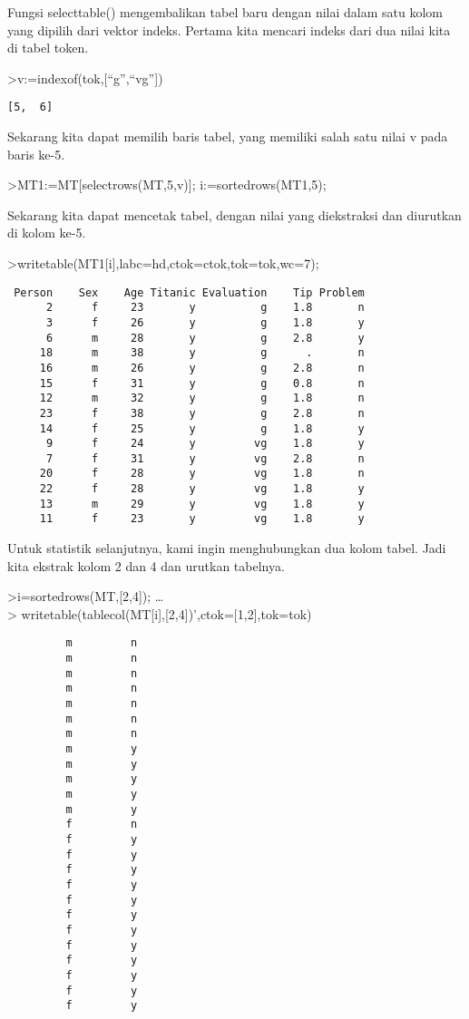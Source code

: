 \documentclass[
]{book}
\begin{document}
Fungsi selecttable() mengembalikan tabel baru dengan nilai dalam satu kolom yang dipilih dari vektor indeks. Pertama kita mencari indeks dari dua nilai kita di tabel token.

\textgreater v:=indexof(tok,{[}``g'',``vg''{]})

\begin{verbatim}
[5,  6]
\end{verbatim}

Sekarang kita dapat memilih baris tabel, yang memiliki salah satu nilai v pada baris ke-5.

\textgreater MT1:=MT{[}selectrows(MT,5,v){]}; i:=sortedrows(MT1,5);

Sekarang kita dapat mencetak tabel, dengan nilai yang diekstraksi dan diurutkan di kolom ke-5.

\textgreater writetable(MT1{[}i{]},labc=hd,ctok=ctok,tok=tok,wc=7);

\begin{verbatim}
 Person    Sex    Age Titanic Evaluation    Tip Problem
      2      f     23       y          g    1.8       n
      3      f     26       y          g    1.8       y
      6      m     28       y          g    2.8       y
     18      m     38       y          g      .       n
     16      m     26       y          g    2.8       n
     15      f     31       y          g    0.8       n
     12      m     32       y          g    1.8       n
     23      f     38       y          g    2.8       n
     14      f     25       y          g    1.8       y
      9      f     24       y         vg    1.8       y
      7      f     31       y         vg    2.8       n
     20      f     28       y         vg    1.8       n
     22      f     28       y         vg    1.8       y
     13      m     29       y         vg    1.8       y
     11      f     23       y         vg    1.8       y
\end{verbatim}

Untuk statistik selanjutnya, kami ingin menghubungkan dua kolom tabel. Jadi kita ekstrak kolom 2 dan 4 dan urutkan tabelnya.

\textgreater i=sortedrows(MT,{[}2,4{]}); \ldots{}\\
\textgreater{} writetable(tablecol(MT{[}i{]},{[}2,4{]})',ctok={[}1,2{]},tok=tok)

\begin{verbatim}
         m         n
         m         n
         m         n
         m         n
         m         n
         m         n
         m         n
         m         y
         m         y
         m         y
         m         y
         m         y
         f         n
         f         y
         f         y
         f         y
         f         y
         f         y
         f         y
         f         y
         f         y
         f         y
         f         y
         f         y
         f         y
\end{verbatim}
\end{document}
